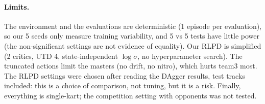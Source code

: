 \documentclass[10pt,a4paper]{article}
\begin{document}
\paragraph{Limits.}
The environment and the evaluations are deterministic (1 episode per evaluation), so our 5 seeds only measure training variability, and 5 vs 5 tests have little power (the non-significant settings are not evidence of equality).
Our RLPD is simplified (2 critics, UTD 4, state-independent $\log\sigma$, no hyperparameter search).
The truncated actions limit the masters (no drift, no nitro), which hurts team3 most.
The RLPD settings were chosen after reading the DAgger results, test tracks included: this is a choice of comparison, not tuning, but it is a risk.
Finally, everything is single-kart; the competition setting with opponents was not tested.

{\small


}
\end{document}

